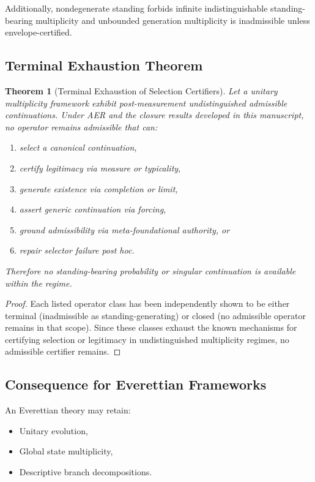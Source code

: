 \documentclass[11pt]{article}
\newtheorem{theorem}[definition]{Theorem}
\theoremstyle{remark}
\theoremstyle{plain}
\begin{document}
Additionally, nondegenerate standing forbids infinite indistinguishable
standing-bearing multiplicity and unbounded generation
multiplicity is inadmissible unless envelope-certified.

\subsection{Terminal Exhaustion Theorem}

\begin{theorem}[Terminal Exhaustion of Selection Certifiers]
\label{thm:terminal-exhaustion}
Let a unitary multiplicity framework exhibit post-measurement
undistinguished admissible continuations.
Under AER and the closure results developed in this manuscript,
no operator remains admissible that can:

\begin{enumerate}
\item select a canonical continuation,
\item certify legitimacy via measure or typicality,
\item generate existence via completion or limit,
\item assert generic continuation via forcing,
\item ground admissibility via meta-foundational authority, or
\item repair selector failure post hoc.
\end{enumerate}

Therefore no standing-bearing probability or singular continuation
is available within the regime.
\end{theorem}

\begin{proof}
Each listed operator class has been independently shown to be either
terminal (inadmissible as standing-generating) or closed
(no admissible operator remains in that scope).
Since these classes exhaust the known mechanisms for certifying
selection or legitimacy in undistinguished multiplicity regimes,
no admissible certifier remains.
\end{proof}

\subsection{Consequence for Everettian Frameworks}

An Everettian theory may retain:

\begin{itemize}
\item Unitary evolution,
\item Global state multiplicity,
\item Descriptive branch decompositions.
\end{itemize}
\end{document}
